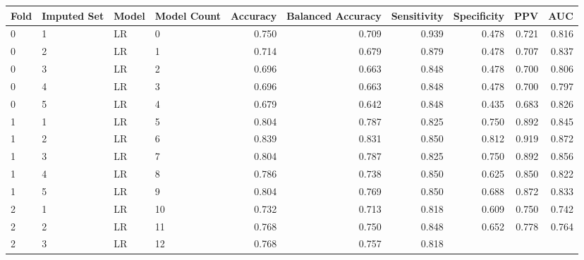 \begin{table}[ht]
\centering
\begin{adjustbox}{width=\textwidth}
\begin{tabular}{llllrrrrrr}
Fold & Imputed Set & Model & Model Count &   Accuracy &  Balanced Accuracy &  
Sensitivity &  
Specificity & PPV & AUC \\ \hline
   0 &           1 &    LR &           0 & 0.750 &  0.709 &        0.939 &      
 
 0.478 & 0.721 & 0.816 \\
   0 &           2 &    LR &           1 & 0.714 &  0.679 &        0.879 &      
 
 0.478 & 0.707 & 0.837 \\
   0 &           3 &    LR &           2 & 0.696 &  0.663 &        0.848 &      
 
 0.478 & 0.700 & 0.806 \\
   0 &           4 &    LR &           3 & 0.696 &  0.663 &        0.848 &      
 
 0.478 & 0.700 & 0.797 \\
   0 &           5 &    LR &           4 & 0.679 &  0.642 &        0.848 &      
 
 0.435 & 0.683 & 0.826 \\
   1 &           1 &    LR &           5 & 0.804 &  0.787 &        0.825 &      
 
 0.750 & 0.892 & 0.845 \\
   1 &           2 &    LR &           6 & 0.839 &  0.831 &        0.850 &      
 
 0.812 & 0.919 & 0.872 \\
   1 &           3 &    LR &           7 & 0.804 &  0.787 &        0.825 &      
 
 0.750 & 0.892 & 0.856 \\
   1 &           4 &    LR &           8 & 0.786 &  0.738 &        0.850 &      
 
 0.625 & 0.850 & 0.822 \\
   1 &           5 &    LR &           9 & 0.804 &  0.769 &        0.850 &      
 
 0.688 & 0.872 & 0.833 \\
   2 &           1 &    LR &          10 & 0.732 &  0.713 &        0.818 &      
 
 0.609 & 0.750 & 0.742 \\
   2 &           2 &    LR &          11 & 0.768 &  0.750 &        0.848 &      
 
 0.652 & 0.778 & 0.764 \\
   2 &           3 &    LR &          12 & 0.768 &  0.757 &        0.818 &      
 

\end{tabular}
\end{adjustbox}
\end{table}
